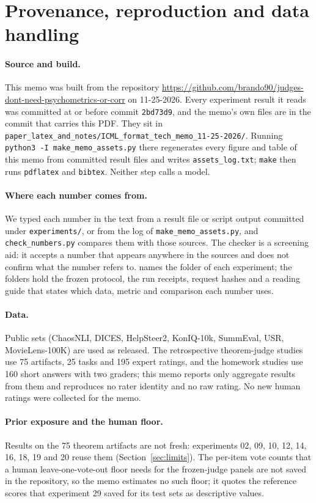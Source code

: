 \section{Provenance, reproduction and data handling}
\label{app:provenance}

\paragraph{Source and build.}
This memo was built from the repository \url{https://github.com/brando90/judges-dont-need-psychometrics-or-corr} on 11-25-2026.
Every experiment result it reads was committed at or before commit \texttt{2bd73d9}, and the memo's own files are in the commit that carries this PDF.
They sit in \texttt{paper\_latex\_and\_notes/ICML\_format\_tech\_memo\_11-25-2026/}.
Running \texttt{python3 -I make\_memo\_assets.py} there regenerates every figure and table of this memo from committed result files and writes \texttt{assets\_log.txt}; \texttt{make} then runs \texttt{pdflatex} and \texttt{bibtex}.
Neither step calls a model.

\paragraph{Where each number comes from.}
We typed each number in the text from a result file or script output committed under \texttt{experiments/}, or from the log of \texttt{make\_memo\_assets.py}, and \texttt{check\_numbers.py} compares them with those sources.
The checker is a screening aid: it accepts a number that appears anywhere in the sources and does not confirm what the number refers to.
 names the folder of each experiment; the folders hold the frozen protocol, the run receipts, request hashes and a reading guide that states which data, metric and comparison each number uses.

\paragraph{Data.}
Public sets (ChaosNLI, DICES, HelpSteer2, KonIQ-10k, SummEval, USR, MovieLens-100K) are used as released.
The retrospective theorem-judge studies use 75 artifacts, 25 tasks and 195 expert ratings, and the homework studies use 160 short answers with two graders; this memo reports only aggregate results from them and reproduces no rater identity and no raw rating.
No new human ratings were collected for the memo.

\paragraph{Prior exposure and the human floor.}
Results on the 75 theorem artifacts are not fresh: experiments 02, 09, 10, 12, 14, 16, 18, 19 and 20 reuse them (Section~\ref{sec:limits}).
The per-item vote counts that a human leave-one-vote-out floor needs for the frozen-judge panels are not saved in the repository, so the memo estimates no such floor; it quotes the reference scores that experiment 29 saved for its test sets as descriptive values.

